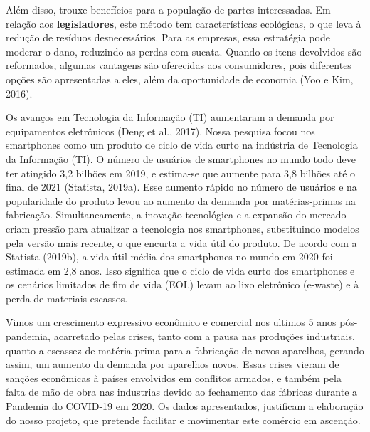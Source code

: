         \begin{citacao}
            Além disso, trouxe benefícios para a população de partes interessadas. Em relação aos \textbf{legisladores}, este método tem características ecológicas, o que leva à redução de resíduos desnecessários. Para as empresas, essa estratégia pode moderar o dano, reduzindo as perdas com sucata. Quando os itens devolvidos são reformados, algumas vantagens são oferecidas aos consumidores, pois diferentes opções são apresentadas a eles, além da oportunidade de economia (Yoo e Kim, 2016).
            
            Os avanços em Tecnologia da Informação (TI) aumentaram a demanda por equipamentos eletrônicos (Deng et al., 2017). Nossa pesquisa focou nos smartphones como um produto de ciclo de vida curto na indústria de Tecnologia da Informação (TI). O número de usuários de smartphones no mundo todo deve ter atingido 3,2 bilhões em 2019, e estima-se que aumente para 3,8 bilhões até o final de 2021 (Statista, 2019a). Esse aumento rápido no número de usuários e na popularidade do produto levou ao aumento da demanda por matérias-primas na fabricação. Simultaneamente, a inovação tecnológica e a expansão do mercado criam pressão para atualizar a tecnologia nos smartphones, substituindo modelos pela versão mais recente, o que encurta a vida útil do produto. De acordo com a Statista (2019b), a vida útil média dos smartphones no mundo em 2020 foi estimada em 2,8 anos. Isso significa que o ciclo de vida curto dos smartphones e os cenários limitados de fim de vida (EOL) levam ao lixo eletrônico (e-waste) e à perda de materiais escassos.
            
        \end{citacao}
            


        Vimos um crescimento expressivo econômico e comercial nos ultimos 5 anos pós-pandemia,
        acarretado pelas crises, tanto com a pausa nas produções industriais, quanto a escassez de 
        matéria-prima para a fabricação de novos aparelhos, gerando assim, um aumento da demanda por 
        aparelhos novos.
        Essas crises vieram de sanções econômicas à países envolvidos em conflitos armados, e também pela
        falta de mão de obra nas industrias devido ao fechamento das fábricas durante a Pandemia do COVID-19 em 2020.
        Os dados apresentados, justificam a elaboração do nosso projeto, que pretende facilitar e movimentar este comércio
        em ascenção.
        

\label{chap:Justificativa}